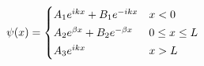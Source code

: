 \documentclass[preview]{standalone}
\begin{document}
\begin{align*}
\special{dvisvgm:raw <g id='unique000'>}\psi(x)=\begin{cases}A_1e^{ikx}+B_1e^{-ikx} & x<0\\[2pt]A_2e^{\beta x}+B_2e^{-\beta x} & 0\le x\le L\\[2pt]A_3e^{ikx} & x>L\end{cases}\special{dvisvgm:raw </g>}
\end{align*}
\end{document}
